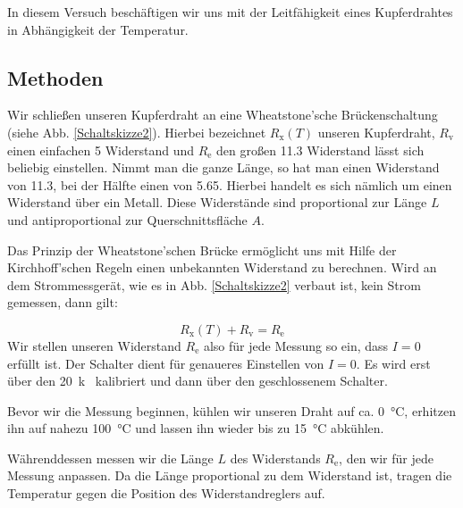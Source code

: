 \documentclass[11pt,a4paper,titlepage, ngerman]{article}
\begin{document}
		In diesem Versuch beschäftigen wir uns mit der Leitfähigkeit eines Kupferdrahtes in Abhängigkeit der Temperatur.
		
		\subsection{Methoden} %
		
			Wir schließen unseren Kupferdraht an eine Wheatstone'sche Brückenschaltung (siehe Abb. \ref{Schaltskizze2}). Hierbei bezeichnet $R_\text{x}(T)$ unseren Kupferdraht, $R_\text{v}$ einen einfachen \SI{5}{\Omega} Widerstand und $R_\text{e}$ den großen \SI{11,3}{\Omega} Widerstand lässt sich beliebig einstellen. Nimmt man die ganze Länge, so hat man einen Widerstand von \SI{11,3}{\Omega}, bei der Hälfte einen von \SI{5,65}{\Omega}. Hierbei handelt es sich nämlich um einen Widerstand über ein Metall. Diese Widerstände sind proportional zur Länge $L$ und antiproportional zur Querschnittsfläche $A$.
			
			Das Prinzip der Wheatstone'schen Brücke ermöglicht uns mit Hilfe der Kirchhoff'schen Regeln einen unbekannten Widerstand zu berechnen.
			Wird an dem Strommessgerät, wie es in Abb. \ref{Schaltskizze2} verbaut ist, kein Strom gemessen, dann gilt:
			
			\begin{equation*}
				R_\text{x}(T) + R_\text{v} =  R_\text{e}
			\end{equation*}
			Wir stellen unseren Widerstand $R_\text{e}$ also für jede Messung so ein, dass $I = 0$ erfüllt ist. Der Schalter dient für genaueres Einstellen von $I = 0$. Es wird erst über den \SI{20}{k\Omega} kalibriert und dann über den geschlossenem Schalter.
			
			Bevor wir die Messung beginnen, kühlen wir unseren Draht auf ca. \SI{0}{\celsius}, erhitzen ihn auf nahezu \SI{100}{\celsius} und lassen ihn wieder bis zu \SI{15}{\celsius} abkühlen.
			
			Währenddessen messen wir die Länge $L$ des Widerstands $R_\text{e}$, den wir für jede Messung anpassen. Da die Länge proportional zu dem Widerstand ist, tragen die Temperatur gegen die Position des Widerstandreglers auf.
						
\end{document}
